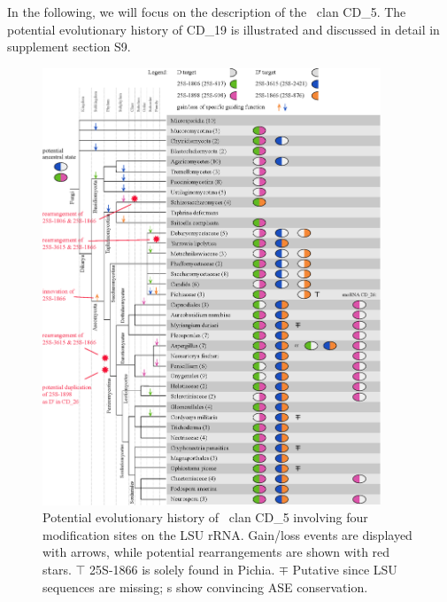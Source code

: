 In the following, we will focus on the description of the \sno\ clan
CD\_5. The potential evolutionary history of CD\_19 is illustrated and
discussed in detail in supplement section S9.

\begin{figure}
  \centering
  \includegraphics[width=0.9\textwidth]{pics/target_switches_CD_5.eps}
  \caption[Potential evolutionary history of \sno\ clan
  CD\_5.]{Potential evolutionary history of \sno\ clan CD\_5 involving
    four modification sites on the LSU rRNA. Gain/loss events are
    displayed with arrows, while potential rearrangements are shown
    with red stars. $\top$ 25S-1866 is solely found in Pichia. $\mp$
    Putative since LSU sequences are missing; \sno s show convincing
    ASE conservation.}
  \label{fig:CD_5}
\end{figure}

